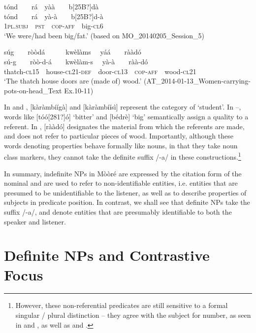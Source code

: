 \documentclass[output=paper]{langsci/langscibook}
\begin{document}
\ea\label{ex:teo:38}
\label{bkm:Ref264214141}tónd\ \ \ \ rá\ \ yà\`{a}\ \ \ \ b[25B?]dà\\
\gll tónd\ \ \ \ rá\ \ yà-\`{a}\ \ \ \ b[25B?]d\nobreakdash-à\\
\textsc{1pl.subj\ \ pst\ \ }\textsc{cop-aff}\ \ big\nobreakdash-\textsc{cl6}\\
\glt ‘We were/had been big/fat.’ (based on MO\_20140205\_Session\_5)
\z

\ea\label{ex:teo:39}
\label{bkm:Ref264214098}súg\ \ \ \ ròòdá\ \ \ \ \ \ kwèlàms \ \ yá\'{a}\ \ \ \ rààdó\\
\gll sú\nobreakdash-g\ \ \ \ ròò\nobreakdash-d\nobreakdash-á\ \ \ \ kwèlàm\nobreakdash-s \ \ y\`{a}-\`{a}\ \ \ \ ràà\nobreakdash-dó\\
thatch\nobreakdash-\textsc{cl15\ \ }house\textsc{{}-cl21\nobreakdash-}\textsc{def}\ \ door\nobreakdash-\textsc{cl13\ \ cop-aff}\ \ wood\nobreakdash-\textsc{cl21}\\
\glt ‘The thatch house doors are (made of) wood.’ (AT\_2014-01-13\_Women-carrying-pots-on-head\_Text Ex.10-11)
\z

In  and  , [kàràmb\'{i}\'{i}gà] and [kàràmb\'{i}\'{i}sì] represent the category of ‘student’. In –, words like [tóó[281?]ó] ‘bitter’ and [bédrè] ‘big’ semantically assign a quality to a referent. In , [rààdó] designates the material from which the referents are made, and does not refer to particular pieces of wood. Importantly, although these words denoting properties behave formally like nouns, in that they take noun class markers, they cannot take the definite suffix /-a/ in these constructions.\footnote{However, these non-referential predicates are still sensitive to a formal singular / plural distinction – they agree with the subject for number, as seen in  and , as well as  and .}

In summary, indefinite NPs in Mòòré are expressed by the citation form of the nominal and are used to refer to non-identifiable entities, i.e. entities that are presumed to be unidentifiable to the listener, as well as to describe properties of subjects in predicate position. In contrast, we shall see that definite NPs take the suffix /-a/, and denote entities that are presumably identifiable to both the speaker and listener.

\section{Definite NPs and Contrastive Focus}\label{sec:6}
\end{document}
